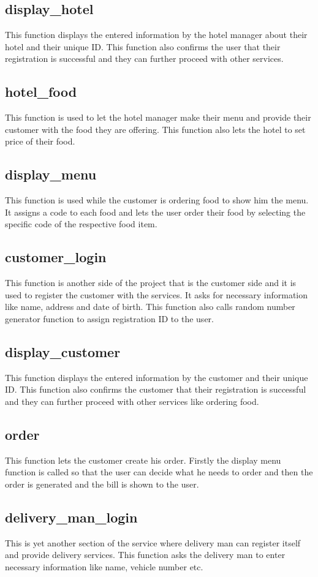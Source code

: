 \documentclass[12pt]{article}
\begin{document}
\subsection{display\_hotel}
This function displays the entered information by the hotel manager about their hotel and their unique ID. This function also confirms the user that their registration is successful and they can further proceed with other services.
\subsection{hotel\_food}
This function is used to let the hotel manager make their menu and provide their customer with the food they are offering. This function also lets the hotel to set price of their food.
\subsection{display\_menu}
This function is used while the customer is ordering food to show him the menu. It assigns a code to each food and lets the user order their food by selecting the specific code of the respective food item.
\subsection{customer\_login}
This function is another side of the project that is the customer side and it is used to register the customer with the services.
It asks for necessary information like name, address and date of birth. This function also calls random number generator function to assign registration ID to the user.
\subsection{display\_customer}
This function displays the entered information by the customer and their unique ID. This function also confirms the customer that their registration is successful and they can further proceed with other services like ordering food.
\subsection{order}
This function lets the customer create his order. Firstly the display  menu function is called so that the user can decide what he needs to order and then the order is generated and the bill is shown to the user.
\subsection{delivery\_man\_login}
This is yet another section of the service where delivery man can register itself and provide delivery services. This function asks the delivery man to enter necessary information like name, vehicle number etc.
\end{document}
